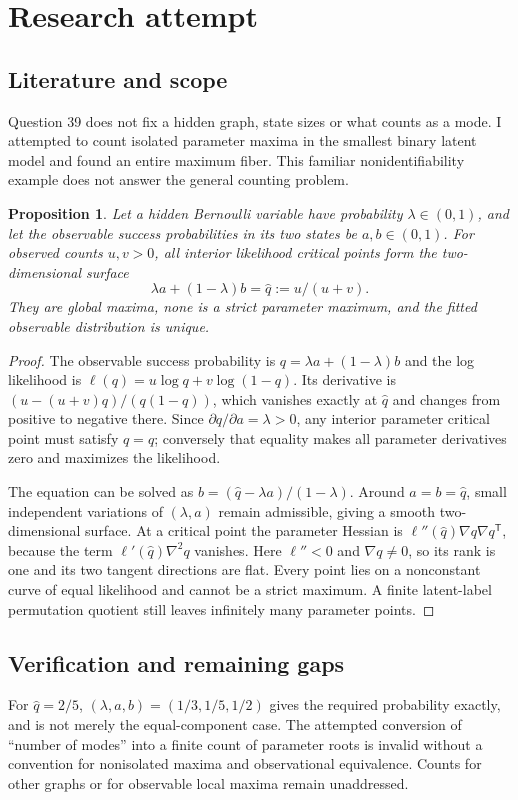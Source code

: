 \documentclass[11pt]{article}
\newtheorem{proposition}{Proposition}
\begin{document}
\section{Research attempt}
\subsection{Literature and scope}
Question 39 does not fix a hidden graph, state sizes or what counts as a mode. I attempted to count isolated parameter maxima in the smallest binary latent model and found an entire maximum fiber. This familiar nonidentifiability example does not answer the general counting problem.
\begin{proposition}
Let a hidden Bernoulli variable have probability $\lambda\in(0,1)$, and let the observable success probabilities in its two states be $a,b\in(0,1)$. For observed counts $u,v>0$, all interior likelihood critical points form the two-dimensional surface
\[
\lambda a+(1-\lambda)b=\widehat q:=u/(u+v).
\]
They are global maxima, none is a strict parameter maximum, and the fitted observable distribution is unique.
\end{proposition}
\begin{proof}
The observable success probability is $q=\lambda a+(1-\lambda)b$ and the log likelihood is $\ell(q)=u\log q+v\log(1-q)$. Its derivative is $(u-(u+v)q)/(q(1-q))$, which vanishes exactly at $\widehat q$ and changes from positive to negative there. Since $\partial q/\partial a=\lambda>0$, any interior parameter critical point must satisfy $q=\widehat q$; conversely that equality makes all parameter derivatives zero and maximizes the likelihood.

The equation can be solved as $b=(\widehat q-\lambda a)/(1-\lambda)$. Around $a=b=\widehat q$, small independent variations of $(\lambda,a)$ remain admissible, giving a smooth two-dimensional surface. At a critical point the parameter Hessian is $\ell''(\widehat q)\nabla q\nabla q^{\mathsf T}$, because the term $\ell'(\widehat q)\nabla^2q$ vanishes. Here $\ell''<0$ and $\nabla q\ne0$, so its rank is one and its two tangent directions are flat. Every point lies on a nonconstant curve of equal likelihood and cannot be a strict maximum. A finite latent-label permutation quotient still leaves infinitely many parameter points.
\end{proof}
\subsection{Verification and remaining gaps}
For $\widehat q=2/5$, $(\lambda,a,b)=(1/3,1/5,1/2)$ gives the required probability exactly, and is not merely the equal-component case. The attempted conversion of ``number of modes'' into a finite count of parameter roots is invalid without a convention for nonisolated maxima and observational equivalence. Counts for other graphs or for observable local maxima remain unaddressed.
\end{document}
